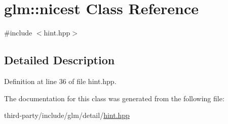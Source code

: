 \hypertarget{classglm_1_1nicest}{}\section{glm\+:\+:nicest Class Reference}
\label{classglm_1_1nicest}


{\ttfamily \#include $<$hint.\+hpp$>$}



\subsection{Detailed Description}


Definition at line 36 of file hint.\+hpp.



The documentation for this class was generated from the following file\+:\begin{DoxyCompactItemize}
\item 
third-\/party/include/glm/detail/\hyperlink{hint_8hpp}{hint.\+hpp}\end{DoxyCompactItemize}

